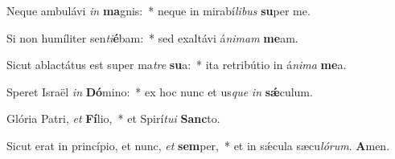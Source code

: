 Neque ambulávi \textit{in} \textbf{ma}gnis:~* neque in mirabí\textit{li}\textit{bus} \textbf{su}per me.

Si non humíliter sen\textit{ti}\textbf{é}bam:~* sed exaltávi á\textit{ni}\textit{mam} \textbf{me}am.

Sicut ablactátus est super ma\textit{tre} \textbf{su}a:~* ita retribútio in á\textit{ni}\textit{ma} \textbf{me}a.

Speret Israël \textit{in} \textbf{Dó}mino:~* ex hoc nunc et us\textit{que} \textit{in} \textbf{sǽ}culum.

Glória Patri, \textit{et} \textbf{Fí}lio,~* et Spirí\textit{tu}\textit{i} \textbf{Sanc}to.

Sicut erat in princípio, et nunc, \textit{et} \textbf{sem}per,~* et in sǽcula sæcu\textit{ló}\textit{rum}. \textbf{A}men.


